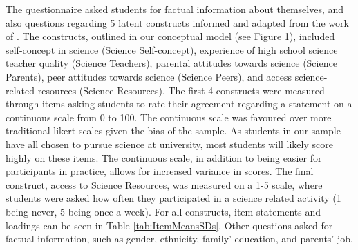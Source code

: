The questionnaire asked students for factual information about themselves, and also questions regarding 5 latent constructs informed and adapted from the work of \cite{dewitt2011high}. The constructs, outlined in our conceptual model (see Figure 1), included self-concept in science (Science Self-concept), experience of high school science teacher quality (Science Teachers), parental attitudes towards science (Science Parents), peer attitudes towards science (Science Peers), and access science-related resources (Science Resources). The first 4 constructs were measured through items asking students to rate their agreement regarding a statement on a continuous scale from 0 to 100. The continuous scale was favoured over more traditional likert scales given the bias of the sample. As students in our sample have all chosen to pursue science at university, most students will likely score highly on these items. The continuous scale, in addition to being easier for participants in practice, allows for increased variance in scores. The final construct, access to Science Resources, was measured on a 1-5 scale, where students were asked how often they participated in a science related activity (1 being never, 5 being once a week). For all constructs, item statements and loadings can be seen in Table \ref{tab:ItemMeansSDs}. Other questions asked for factual information, such as gender, ethnicity, family’ education, and parents' job. 

